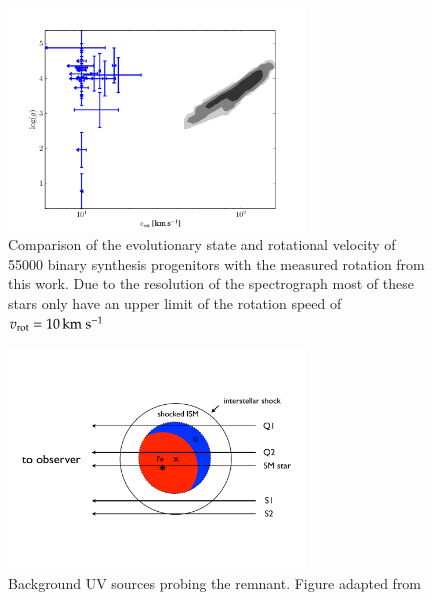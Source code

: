\begin{figure}[tb] %
   \centering
   \includegraphics[width=0.7\textwidth]{chapter_sn1006/plots/compare_vrot.pdf} 
   \caption[Comparison of rotation and surface gravity of SN 1006 candidates]{Comparison of the evolutionary state and rotational velocity of 55000 binary synthesis  progenitors \citep[gray shades;data from][]{2008ApJ...677L.109H} with the measured rotation from this work. Due to the resolution of the spectrograph most of these stars only have an upper limit of the rotation speed of $v_{\textrm{rot}}=10\,\textrm{km}~\textrm{s}^{-1}$}
   \label{fig:han2008_vrot_compare}
\end{figure}


\begin{figure}[htbp] %
   \centering
   \includegraphics[width=0.7\textwidth]{chapter_sn1006/plots/Winkler2005_probingsn1006_cropped.pdf} 
   \caption[Background UV sources probing the remnant]{Background UV sources probing the remnant. Figure adapted from \citet{2005ApJ...624..189W}}
   \label{fig:sn1006_uvprobe}
\end{figure}

